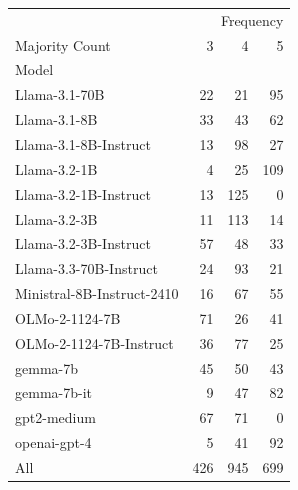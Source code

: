\begin{tabular}{lrrr}
\toprule
 & \multicolumn{3}{r}{Frequency} \\
Majority Count & 3 & 4 & 5 \\
Model &  &  &  \\
\midrule
Llama-3.1-70B & 22 & 21 & 95 \\
Llama-3.1-8B & 33 & 43 & 62 \\
Llama-3.1-8B-Instruct & 13 & 98 & 27 \\
Llama-3.2-1B & 4 & 25 & 109 \\
Llama-3.2-1B-Instruct & 13 & 125 & 0 \\
Llama-3.2-3B & 11 & 113 & 14 \\
Llama-3.2-3B-Instruct & 57 & 48 & 33 \\
Llama-3.3-70B-Instruct & 24 & 93 & 21 \\
Ministral-8B-Instruct-2410 & 16 & 67 & 55 \\
OLMo-2-1124-7B & 71 & 26 & 41 \\
OLMo-2-1124-7B-Instruct & 36 & 77 & 25 \\
gemma-7b & 45 & 50 & 43 \\
gemma-7b-it & 9 & 47 & 82 \\
gpt2-medium & 67 & 71 & 0 \\
openai-gpt-4 & 5 & 41 & 92 \\
All & 426 & 945 & 699 \\
\bottomrule
\end{tabular}

